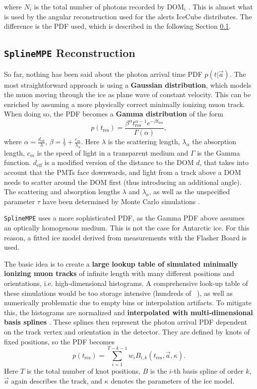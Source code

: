 where $N_i$ is the total number of photons recorded by $\text{DOM}_i$ \cite{Ahrens2004}. This is almost what is used by the angular reconstruction used for the alerts IceCube distributes. The difference is the PDF used, which is described in the following Section \ref{spline_mpe}.

\subsection{\texttt{SplineMPE} Reconstruction} \label{spline_mpe}
So far, nothing has been said about the photon arrival time PDF $p(t|\vec{a})$. The most straightforward approach is using a \textbf{Gaussian distribution}, which models the muon moving through the ice as plane wave of constant velocity. This can be enriched by assuming a more physically correct minimally ionizing muon track. When doing so, the PDF becomes a \textbf{Gamma distribution} of the form
\begin{equation}
    p(t_\text{res}) = \frac{\beta^\alpha t_\text{res}^{\alpha-1} e^{-\beta t_\text{res}}}{\Gamma(\alpha)},
\end{equation}
where $\alpha=\frac{d_\text{eff}}{\lambda}$, $\beta=\frac{1}{\tau} + \frac{c_m}{\lambda_\alpha}$. Here $\lambda$ is the scattering length, $\lambda_\alpha$ the absorption length, $c_m$ is the speed of light in a transparent medium and $\Gamma$ is the Gamma function. $d_\text{eff}$ is a modified version of the distance to the DOM $d$, that takes into account that the PMTs face downwards, and light from a track above a DOM needs to scatter around the DOM first (thus introducing an additional angle). The scattering and absorption lengths $\lambda$ and $\lambda_a$, as well as the unspecified parameter $\tau$ have been determined by Monte Carlo simulations .

\texttt{SplineMPE} uses a more sophisticated PDF, as the Gamma PDF above assumes an optically homogenous medium. This is not the case for Antarctic ice. For this reason, a fitted ice model derived from measurements with the Flasher Board is used.

The basic idea is to create a \textbf{large lookup table of simulated minimally ionizing muon tracks} of infinite length with many different positions and orientations, i.e. high-dimensional histograms. A comprehensive look-up table of these simulations would be too storage intensive (hundreds of \unit{\giga\byte}), as well as numerically problematic due to empty bins or interpolation artifacts. To mitigate this, the histograms are normalized and \textbf{interpolated with multi-dimensional basis splines} . These splines then represent the photon arrival PDF dependent on the track vertex and orientation in the detector. They are defined by knots of fixed positions, so the PDF becomes
\begin{equation}
     p(t_\text{res}) = \sum_{i=1}^{T-k-1} w_i B_{i,k}(t_\text{res},\vec{a}, \kappa).
 \end{equation} 
Here $T$ is the total number of knot positions, $B$ is the $i$-th basis spline of order $k$, $\vec{a}$ again describes the track, and $\kappa$ denotes the parameters of the ice model.

